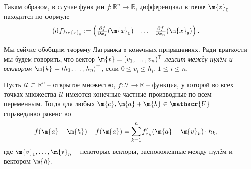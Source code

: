 Таким образом, в случае функции $f:\mathbb{R}^n \to \mathbb{R}$, дифференциал в точке $\m{x}_0$ находится по формуле
\[
 (\mathrm{d}f)_{\m{x}_0}: = \begin{pmatrix}
     \frac{\partial f}{\partial x_1}(\m{x}_0) & \ldots & \frac{\partial f}{\partial x_n}(\m{x}_0)
 \end{pmatrix}.
\]



Мы сейчас обобщим теорему Лагранжа о конечных приращениях. Ради краткости мы будем говорить, что вектор $\m{v} = (v_1,\ldots, v_n)^\top$ \textit{лежит между нулём и вектором} $\m{h} = (h_1,\ldots, h_n)^\top$, если $0\le v_i \le h_i$. $1\le i \le n.$

\begin{theorem}\label{gen_of_Langrange}
    Пусть $\mathscr{U} \subseteq \mathbb{R}^n$ -- открытое множество, $f:\mathscr{U} \to \mathbb{R}$ -- функция, у которой во всех точках множества $\mathscr{U}$ имеются конечные частные производные по всем переменным. Тогда для любых $\m{a}, \m{a} + \m{h} \in \mathscr{U}$ справедливо равенство
\[
 f(\m{a} + \m{h}) - f(\m{a}) = \sum_{k =1}^n f'_{x_k}({\m{a} + \m{v}_k}) \cdot h_k,
\]
где $\m{v}_1, \ldots, \m{v}_n$ -- некоторые векторы, расположенные между нулём и вектором $\m{h}.$
\end{theorem}

